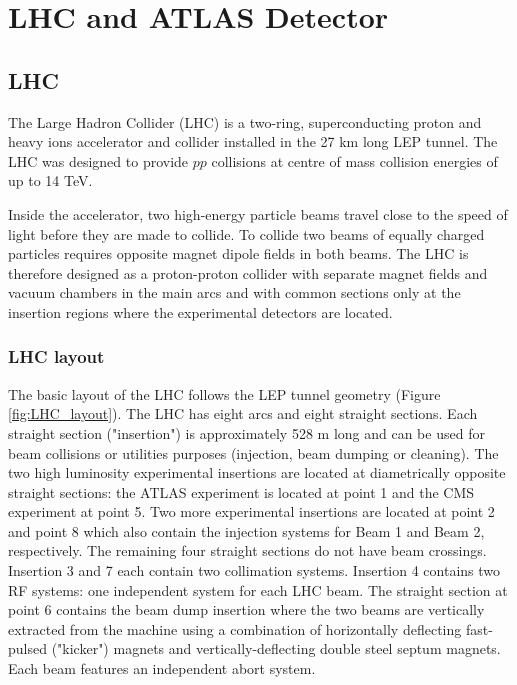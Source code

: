 \documentclass[a4paper, oneside, 11pt, openright]{book}
\begin{document}
	\chapter{LHC and ATLAS Detector}\label{chapter:1}
		\section{LHC}
			The Large Hadron Collider (LHC) \cite{LHC_DESIGN_2008} is a two-ring, superconducting proton and heavy ions accelerator and collider installed in the 27 km long LEP \cite{LEP_DESIGN_2001} tunnel. The LHC was designed to provide $pp$ collisions at centre of mass collision energies of up to 14 TeV. 
			
			Inside the accelerator, two high-energy particle beams travel close to the speed of light before they are made to collide. To collide two beams of equally charged particles requires opposite magnet dipole fields in both beams. The LHC is therefore designed as a proton-proton collider with separate magnet fields and vacuum chambers in the main arcs and with common sections only at the insertion regions where the experimental detectors are located. 
		
			\subsection{LHC layout}
				The basic layout of the LHC \cite{LHC_DESIGN_2004} follows the LEP tunnel geometry (Figure \ref{fig:LHC_layout}). The LHC has eight arcs and eight straight sections. Each straight section ("insertion") is approximately 528 m long and can be used for beam collisions or utilities purposes (injection, beam dumping or cleaning). The two high luminosity experimental insertions are located at diametrically opposite straight sections: the {ATLAS} experiment is located at point 1 and the CMS experiment at point 5. Two more experimental insertions are located at point 2 and point 8 which also contain the injection systems for Beam 1 and Beam 2, respectively. The remaining four straight sections do not have beam crossings. Insertion 3 and 7 each contain two collimation systems. Insertion 4 contains two RF systems: one independent system for each LHC beam. The straight section at point 6 contains the beam dump insertion where the two beams are vertically extracted from the machine using a combination of horizontally deflecting fast-pulsed ("kicker") magnets and vertically-deflecting double steel septum magnets. Each beam features an independent abort system.
				
\end{document}
